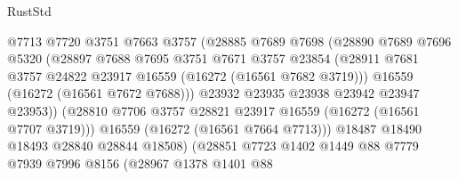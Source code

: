 \begin{lexlean}{RustStd}
\begin{coremodule}
                                @7713
                                @7720
                                @3751
                                @7663
                                @3757
                                (@28885
                                  @7689
                                  @7698
                                  (@28890
                                    @7689
                                    @7696
                                    @5320
                                    (@28897
                                      @7688
                                      @7695
                                      @3751
                                      @7671
                                      @3757
                                      @23854
                                      (@28911
                                        @7681
                                        @3757
                                        @24822
                                        @23917
                                        @16559
                                        (@16272 (@16561 @7682 @3719)))
                                      @16559
                                      (@16272 (@16561 @7672 @7688)))
                                    @23932
                                    @23935
                                    @23938
                                    @23942
                                    @23947
                                    @23953))
                                (@28810
                                  @7706
                                  @3757
                                  @28821
                                  @23917
                                  @16559
                                  (@16272 (@16561 @7707 @3719)))
                                @16559
                                (@16272 (@16561 @7664 @7713)))
                              @18487
                              @18490
                              @18493
                              @28840
                              @28844
                              @18508)
                            (@28851
                              @7723
                              @1402
                              @1449
                              @88
                              @7779
                              @7939
                              @7996
                              @8156
                              (@28967
                                @1378
                                @1401
                                @88

\end{coremodule}
\end{lexlean}
